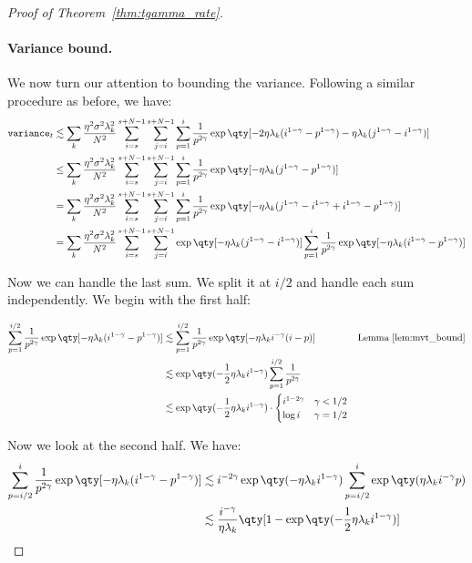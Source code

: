 \documentclass{article}
\def\variance{\mathtt{variance}}
\def\variance{\mathtt{variance}}
\theoremstyle{plain}
\def\variance{\mathtt{variance}}
\begin{document}
\begin{proof}[Proof of Theorem~\ref{thm:tgamma_rate}]
\paragraph{Variance bound.} We now turn our attention to bounding the variance. Following a similar procedure as before, we have:
\begin{align*}
    \variance_t &\lesssim \sum_{k} \frac{\eta^2 \sigma^2 \lambda_k^2}{N^2} \sum_{i=s}^{s+N-1} \sum_{j=i}^{s+N-1} \sum_{p=1}^{i} \frac{1}{p^{2\gamma}} \exp\qty[-2\eta \lambda_k (i^{1-\gamma} - p^{1-\gamma}) -\eta \lambda_k(j^{1-\gamma} - i^{1-\gamma})] \\
    &\leq \sum_{k}\frac{\eta^2 \sigma^2 \lambda_k^2}{N^2} \sum_{i=s}^{s+N-1} \sum_{j=i}^{s+N-1} \sum_{p=1}^{i} \frac{1}{p^{2\gamma}} \exp\qty[-\eta \lambda_k (j^{1-\gamma} - p^{1-\gamma})] \\
    &= \sum_{k}\frac{\eta^2 \sigma^2 \lambda_k^2}{N^2} \sum_{i=s}^{s+N-1} \sum_{j=i}^{s+N-1} \sum_{p=1}^{i} \frac{1}{p^{2\gamma}} \exp\qty[-\eta \lambda_k (j^{1-\gamma} - i^{1-\gamma} + i^{1-\gamma} - p^{1-\gamma})] \\
    &= \sum_{k}\frac{\eta^2 \sigma^2 \lambda_k^2}{N^2} \sum_{i=s}^{s+N-1} \sum_{j=i}^{s+N-1} \exp\qty[-\eta\lambda_k (j^{1-\gamma} - i^{1-\gamma})]\sum_{p=1}^{i} \frac{1}{p^{2\gamma}} \exp\qty[-\eta \lambda_k(i^{1-\gamma} - p^{1-\gamma})]
\end{align*}


Now we can handle the last sum. We split it at $i/2$ and handle each sum independently. We begin with the first half:

\begin{align*}
    \sum_{p=1}^{i/2} \frac{1}{p^{2\gamma}} \exp\qty[-\eta \lambda_k(i^{1-\gamma} - p^{1-\gamma})] &\lesssim \sum_{p=1}^{i/2} \frac{1}{p^{2\gamma}} \exp\qty[-\eta \lambda_k i^{-\gamma}(i-p)] & \text{Lemma~\ref{lem:mvt_bound}} \\
    &\lesssim \exp\qty(-\frac{1}{2}\eta \lambda_k i^{1-\gamma}) \sum_{p=1}^{i/2} \frac{1}{p^{2\gamma}} \\
    &\lesssim \exp\qty(-\frac{1}{2}\eta \lambda_k i^{1-\gamma}) \cdot
        \begin{cases}
    i^{1 - 2\gamma} & \gamma < 1/2\\
    \log{i} & \gamma=1/2 
    \end{cases}
\end{align*}

Now we look at the second half. We have:
\begin{align*}
     \sum_{p=i/2}^{i} \frac{1}{p^{2\gamma}} \exp\qty[-\eta \lambda_k(i^{1-\gamma} - p^{1-\gamma})] &\lesssim i^{-2\gamma} \exp\qty(-\eta \lambda_k i^{1-\gamma}) \sum_{p=i/2}^i \exp\qty(\eta \lambda_k i^{-\gamma}p) \\
     &\lesssim \frac{i^{-\gamma}}{\eta \lambda_k} \qty[1 - \exp\qty(-\frac{1}{2} \eta \lambda_k i^{1-\gamma})]
\end{align*}


\end{proof}
\end{document}
